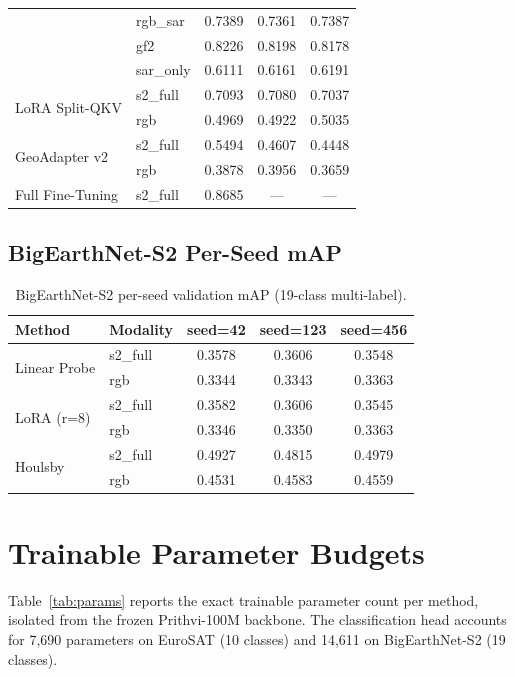 \documentclass[11pt]{article}
\begin{document}
\begin{table}[h]
\begin{tabular}{llccc}
 & rgb\_sar   & 0.7389 & 0.7361 & 0.7387 \\
 & gf2        & 0.8226 & 0.8198 & 0.8178 \\
 & sar\_only  & 0.6111 & 0.6161 & 0.6191 \\
\midrule
\multirow{2}{*}{LoRA Split-QKV}
 & s2\_full   & 0.7093 & 0.7080 & 0.7037 \\
 & rgb        & 0.4969 & 0.4922 & 0.5035 \\
\midrule
\multirow{2}{*}{GeoAdapter v2}
 & s2\_full   & 0.5494 & 0.4607 & 0.4448 \\
 & rgb        & 0.3878 & 0.3956 & 0.3659 \\
\midrule
Full Fine-Tuning & s2\_full & 0.8685 & --- & --- \\
\bottomrule
\end{tabular}
\end{table}

\subsection{BigEarthNet-S2 Per-Seed mAP}

\begin{table}[h]
\centering
\small
\caption{BigEarthNet-S2 per-seed validation mAP (19-class multi-label).}
\label{tab:bigearthnet-per-seed}
\begin{tabular}{llccc}
\toprule
Method & Modality & seed=42 & seed=123 & seed=456 \\
\midrule
\multirow{2}{*}{Linear Probe}
 & s2\_full   & 0.3578 & 0.3606 & 0.3548 \\
 & rgb        & 0.3344 & 0.3343 & 0.3363 \\
\midrule
\multirow{2}{*}{LoRA (r=8)}
 & s2\_full   & 0.3582 & 0.3606 & 0.3545 \\
 & rgb        & 0.3346 & 0.3350 & 0.3363 \\
\midrule
\multirow{2}{*}{Houlsby}
 & s2\_full   & 0.4927 & 0.4815 & 0.4979 \\
 & rgb        & 0.4531 & 0.4583 & 0.4559 \\
\bottomrule
\end{tabular}
\end{table}

\section{Trainable Parameter Budgets}
\label{app:params}

Table~\ref{tab:params} reports the exact trainable parameter count per method, isolated from the frozen Prithvi-100M backbone. The classification head accounts for 7{,}690 parameters on EuroSAT (10 classes) and 14{,}611 on BigEarthNet-S2 (19 classes).
\end{document}
